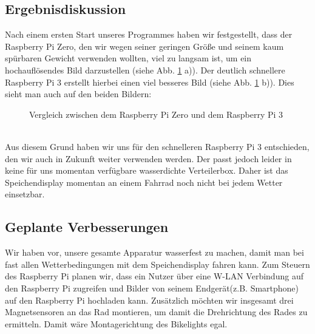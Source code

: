 \documentclass [a4paper, 11pt] {article}
\begin{document}
\subsection{Ergebnisdiskussion}
Nach einem ersten Start unseres Programmes haben wir festgestellt, dass der Raspberry Pi Zero, den wir wegen seiner geringen Größe und seinem kaum spürbaren Gewicht verwenden wollten, viel zu langsam ist, um ein hochauflösendes Bild darzustellen (siehe Abb. \ref{Vergleich} a)). Der deutlich schnellere Raspberry Pi 3 erstellt hierbei einen viel besseres Bild (siehe Abb. \ref{Vergleich} b)). Dies sieht man auch auf den beiden Bildern:
\begin{figure}[h]
\centering
{} 
\caption{Vergleich zwischen dem Raspberry Pi Zero und dem Raspberry Pi 3}
\label{Vergleich}
\end{figure}
\\Aus diesem Grund haben wir uns für den schnelleren Raspberry Pi 3 entschieden, den wir auch in Zukunft weiter verwenden werden. Der passt jedoch leider in keine für uns momentan verfügbare wasserdichte Verteilerbox. Daher ist das Speichendisplay momentan an einem Fahrrad noch nicht bei jedem Wetter einsetzbar.
\subsection{Geplante Verbesserungen}
Wir haben vor, unsere gesamte Apparatur wasserfest zu machen, damit man bei fast allen Wetterbedingungen mit dem Speichendisplay fahren kann. Zum Steuern des Raspberry Pi planen wir, dass ein Nutzer über eine W-LAN Verbindung auf den Raspberry Pi zugreifen und Bilder von seinem Endgerät(z.B. Smartphone) auf den Raspberry Pi hochladen kann. Zusätzlich möchten wir insgesamt drei Magnetsensoren an das Rad montieren, um damit die Drehrichtung des Rades zu ermitteln. Damit wäre Montagerichtung des Bikelights egal. 
\end{document}
